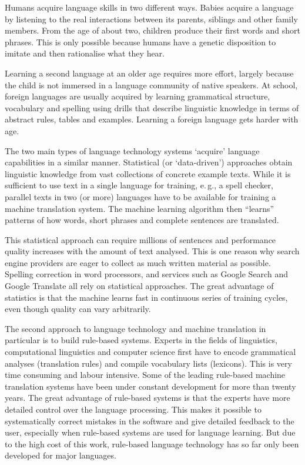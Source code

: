 \begin{multicols}{2}
Humans acquire language skills in two different ways. Babies acquire a language by listening to the real interactions between its parents, siblings and other family members. From the age of about two, children produce their first words and short phrases. This is only possible because humans have a genetic disposition to imitate and then rationalise what they hear. 

Learning a second language at an older age requires more effort, largely because the child is not immersed in a language community of native speakers. At school, foreign languages are usually acquired by learning grammatical structure, vocabulary and spelling using drills that describe linguistic knowledge in terms of abstract rules, tables and examples. Learning a foreign language gets harder with age.


The two main types of language technology systems ‘acquire’ language capabilities in a similar manner. Statistical (or ‘data-driven’) approaches obtain linguistic knowledge from vast collections of concrete example texts. While it is sufficient to use text in a single language for training, e.\,g., a spell checker, parallel texts in two (or more) languages have to be available for training a machine translation system. The machine learning algorithm then “learns” patterns of how words, short phrases and complete sentences are translated. 

This statistical approach can require millions of sentences and performance quality increases with the amount of text analysed. This is one reason why search engine providers are eager to collect as much written material as possible. Spelling correction in word processors, and services such as Google Search and Google Translate all rely on statistical approaches. The great advantage of statistics is that the machine learns fast in continuous series of training cycles, even though quality can vary arbitrarily.

The second approach to language technology and machine translation in particular is to build rule-based systems. Experts in the fields of linguistics, computational linguistics and computer science first have to encode grammatical analyses (translation rules) and compile vocabulary lists (lexicons). This is very time consuming and labour intensive. Some of the leading rule-based machine translation systems have been under constant development for more than twenty years. The great advantage of rule-based systems is that the experts have more detailed control over the language processing. This makes it possible to systematically correct mistakes in the software and give detailed feedback to the user, especially when rule-based systems are used for language learning. But due to the high cost of this work, rule-based language technology has so far only been developed for major languages. 


\end{multicols}
